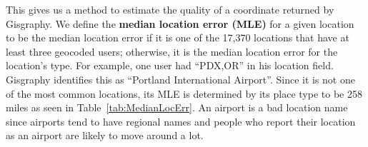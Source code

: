 This gives us a method to estimate the quality of a coordinate returned by
Gisgraphy.
%
We define the \textbf{median location error (MLE)} for a given location to
be the median location error if it is one of the 17,370 locations that have
at least three geocoded users; otherwise, it is the median
location error for the location's type.
%
For example, one user had ``PDX,OR'' in his location field.
%
Gisgraphy identifies this as ``Portland International Airport''.
%
Since it is not one of the most common locations, its MLE is determined by its
place type to be 258 miles as seen in Table~\ref{tab:MedianLocErr}.
%
An airport is a bad location name since airports tend to have regional names
and people who report their location as an airport are likely to move around a
lot.

%
%
%

